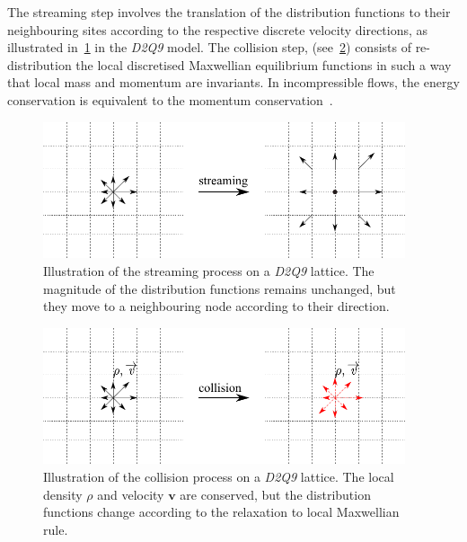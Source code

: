 The streaming step involves the translation of the distribution functions to 
their neighbouring sites according to the respective discrete velocity 
directions, as illustrated in~\cref{fig:stream} in the \textit{D2Q9} model. The 
collision step, (see~\cref{fig:collision}) consists of re-distribution the 
local discretised Maxwellian equilibrium functions in such a way that 
local mass and momentum are invariants. In incompressible flows, the energy 
conservation is equivalent to the momentum conservation~\citep{He1997}.

\begin{figure}[htbp]
	\centering
	\includegraphics[width=0.95\textwidth]{stream}
	\caption[Illustration of the streaming process on a \textit{D2Q9} 
	lattice]{Illustration of the streaming process on a \textit{D2Q9} lattice. 
	The magnitude of the distribution functions remains unchanged, but they 
	move to a neighbouring node according to their direction.}
	\label{fig:stream}
\end{figure}

\begin{figure}[htbp]
	\centering
	\includegraphics[width=0.95\textwidth]{collision}
	\caption[Illustration of the collision process on a \textit{D2Q9} 
	lattice]{Illustration of the collision process on a \textit{D2Q9} lattice. 
	The local density $\rho$ and velocity $\mathbf{v}$ are conserved, but the 
	distribution functions change according to the relaxation to local 
	Maxwellian rule.}
	\label{fig:collision}
\end{figure} 

